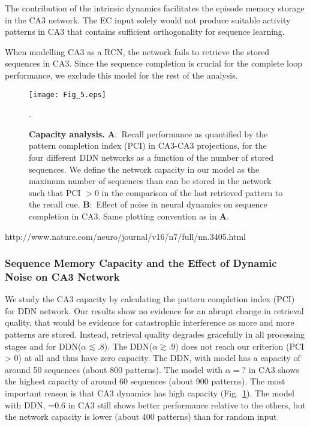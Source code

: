 \documentclass[utf8]{frontiersSCNS} %
\begin{document}
The contribution of the intrinsic dynamics facilitates the episode memory storage in the CA3 network. The EC input solely would not produce suitable activity patterns in CA3 that contains sufficient orthogonality for sequence learning.

When modelling CA3 as a RCN, the network fails to retrieve the stored sequences in CA3. Since the sequence completion is crucial for the complete loop performance, we exclude this model for the rest of the analysis.


\begin{figure}[!htb]
\centering\texttt{[image: Fig\_5.eps]}
\caption{\textbf{Capacity analysis.} 
\textbf{A}:~Recall performance as quantified by the pattern completion index (PCI) in CA3-CA3 projections, for the four different DDN networks as a function of the number of stored sequences. 
We define the network capacity in our model as the maximum number of sequences than can be stored in the network such that PCI $> 0$ in the comparison of the last retrieved pattern to the recall cue. \textbf{B}:~Effect of noise in neural dynamics on sequence completion in CA3.
Same plotting convention as in \textbf{A}.
}.   
\label{Fig_5}
\end{figure}

http://www.nature.com/neuro/journal/v16/n7/full/nn.3405.html


\subsubsection{Sequence Memory Capacity and the Effect of Dynamic Noise on CA3 Network}

We study the CA3 capacity by calculating the pattern completion index (PCI) for DDN network. Our results show no evidence for an abrupt change in retrieval quality, that would be evidence for catastrophic interference as more and more patterns are stored. Instead, retrieval quality degrades gracefully in all processing stages and for DDN($\alpha \lesssim .8$).
The DDN($\alpha \gtrsim .9$) does not reach our criterion (PCI > 0) at all and thus have zero capacity. The DDN, with  model has a capacity of around 50 sequences (about 800 patterns). The model with $\alpha = ?$ in CA3 shows the highest capacity of around 60 sequences (about 900 patterns). The most important reason is that CA3 dynamics has high capacity (Fig.~\ref{Fig_5}).  
The model with DDN, =0.6 in CA3 still shows better performance relative to the others, but the network capacity is lower (about 400 patterns) than for random input
\end{document}
